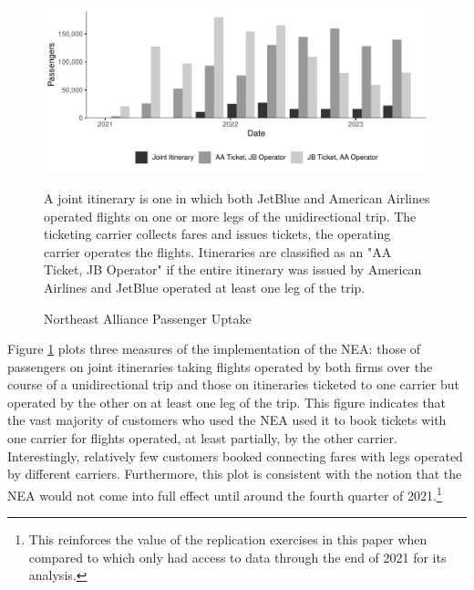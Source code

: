 \documentclass{article}
\begin{document}

    \begin{figure}
        \caption{Northeast Alliance Passenger Uptake}
        \label{fig:NEA_Uptake}
        \begin{center}
            \includegraphics[width = \linewidth]{05.Figures/NEA_OperationsGraph}
        \end{center}
        \vspace{-8mm}
        \footnotesize{A joint itinerary is one in which both JetBlue and American Airlines operated flights on one or more legs of the unidirectional trip. The ticketing carrier collects fares and issues tickets, the operating carrier operates the flights. Itineraries are classified as an "AA Ticket, JB Operator" if the entire itinerary was issued by American Airlines and JetBlue operated at least one leg of the trip.}
    \end{figure}

    Figure \ref{fig:NEA_Uptake} plots three measures of the implementation of the NEA: those of passengers on joint itineraries taking flights operated by both firms over the course of a unidirectional trip and those on itineraries ticketed to one carrier but operated by the other on at least one leg of the trip. This figure indicates that the vast majority of customers who used the NEA used it to book tickets with one carrier for flights operated, at least partially, by the other carrier. Interestingly, relatively few customers booked connecting fares with legs operated by different carriers. Furthermore, this plot is consistent with the notion that the NEA would not come into full effect until around the fourth quarter of 2021.\footnote{This reinforces the value of the replication exercises in this paper when compared to \citet{zou_assessing_2023} which only had access to data through the end of 2021 for its analysis.} 
    
\end{document}
